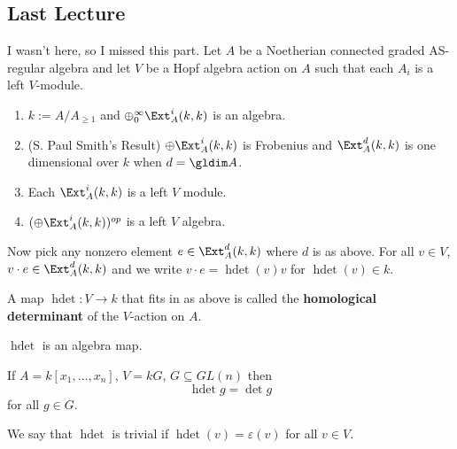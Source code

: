 \documentclass[12pt]{article}
\begin{document}
\subsection{Last Lecture}
I wasn't here, so I missed this part. Let $A$ be a Noetherian connected graded AS-regular algebra and let
$V$ be a Hopf algebra action on $A$ such that each $A_i$ is a left $V$-module.
\begin{enumerate}
	\item $k:=A/A_{\ge 1}$ and $\oplus_0^\infty \Ext_A^i(k,k)$ is an algebra.
	\item (S. Paul Smith's Result) $\oplus \Ext_A^i(k,k)$ is Frobenius and $\Ext_A^d(k,k)$ is one
	dimensional over $k$ when $d=\gldim A$.
	\item  Each $\Ext^i_A(k,k)$ is a left $V$ module.
	\item $(\oplus \Ext_A^i(k,k))^{op}$ is a left $V$ algebra.
\end{enumerate}

Now pick any nonzero element $e\in \Ext_A^d(k,k)$ where $d$ is as above. For all $v\in V$, 
$v\cdot e\in \Ext_A^d(k,k)$ and we write $v\cdot e=\operatorname{hdet}(v)v$ for $\operatorname{hdet}(v)\in k$.
\begin{defn}
	A map $\operatorname{hdet}:V\to k$ that fits in as above is called the \textbf{homological determinant}
	of the $V$-action on $A$.
\end{defn}
\begin{lem}
	$\operatorname{hdet}$ is an algebra map.
\end{lem}
\begin{lem}
	If $A=k[x_1,\dots,x_n]$, $V=kG$, $G\subseteq GL(n)$ then
	\[\operatorname{hdet} g = \det g\]
	for all $g\in G$.
\end{lem}
\begin{defn}
	We say that $\operatorname{hdet}$ is trivial if $\operatorname{hdet}(v)=\varepsilon(v)$ for all $v\in V$.
\end{defn}
\end{document}
